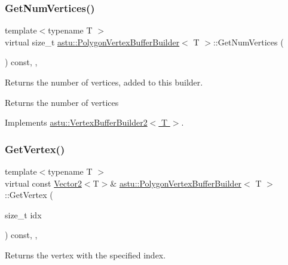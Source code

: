 \subsubsection{\texorpdfstring{Get\+Num\+Vertices()}{GetNumVertices()}}
{\footnotesize\ttfamily template$<$typename T $>$ \\
virtual size\+\_\+t \hyperlink{classastu_1_1PolygonVertexBufferBuilder}{astu\+::\+Polygon\+Vertex\+Buffer\+Builder}$<$ T $>$\+::Get\+Num\+Vertices (\begin{DoxyParamCaption}{ }\end{DoxyParamCaption}) const\hspace{0.3cm}{\ttfamily [inline]}, {\ttfamily [override]}, {\ttfamily [virtual]}}

Returns the number of vertices, added to this builder.

\begin{DoxyReturn}{Returns}
the number of vertices 
\end{DoxyReturn}


Implements \hyperlink{classastu_1_1VertexBufferBuilder2_ae715cb61f66200f1971b2bd6142b1715}{astu\+::\+Vertex\+Buffer\+Builder2$<$ T $>$}.

\mbox{\label{classastu_1_1PolygonVertexBufferBuilder_ac8ae6ab6039dde91530a79000ac3da3e}} 
\subsubsection{\texorpdfstring{Get\+Vertex()}{GetVertex()}}
{\footnotesize\ttfamily template$<$typename T $>$ \\
virtual const \hyperlink{classastu_1_1Vector2}{Vector2}$<$T$>$\& \hyperlink{classastu_1_1PolygonVertexBufferBuilder}{astu\+::\+Polygon\+Vertex\+Buffer\+Builder}$<$ T $>$\+::Get\+Vertex (\begin{DoxyParamCaption}\item[{size\+\_\+t}]{idx }\end{DoxyParamCaption}) const\hspace{0.3cm}{\ttfamily [inline]}, {\ttfamily [override]}, {\ttfamily [virtual]}}

Returns the vertex with the specified index.


